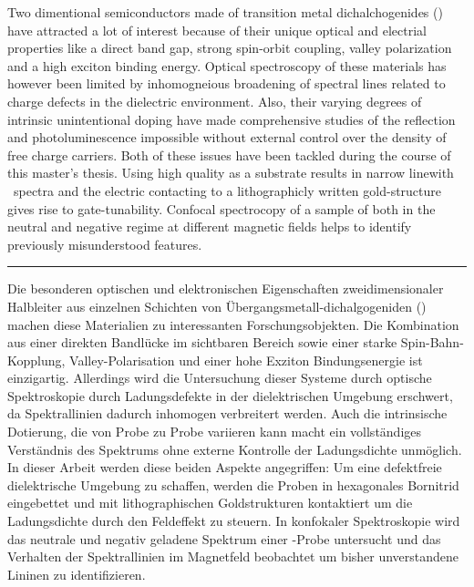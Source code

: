 
Two dimentional semiconductors made of transition metal dichalchogenides (\tmds\!) have attracted a lot of interest because of their unique optical and electrial properties like a direct band gap, strong spin-orbit coupling, valley polarization and a high exciton binding energy. Optical spectroscopy of these materials has however been limited by inhomogneious broadening of spectral lines related to charge defects in the dielectric environment. Also, their varying degrees of intrinsic unintentional doping have made comprehensive studies of the reflection and photoluminescence impossible without external control over the density of free charge carriers. Both of these issues have been tackled during the course of this master's thesis. Using high quality \hbng as a substrate results in narrow linewith \pl\ spectra and the electric contacting to a lithographicly written gold-structure gives rise to gate-tunability. Confocal spectrocopy of a sample of \wse both in the neutral and negative regime at different magnetic fields helps to identify previously misunderstood features.\newline
\begin{center}
\par\rule[8pt]{0.7\textwidth}{1pt}
\end{center}
Die besonderen optischen und elektronischen Eigenschaften zweidimensionaler Halbleiter aus einzelnen Schichten von Übergangsmetall-dichalgogeniden (\tmds\!) machen diese Materialien zu interessanten Forschungsobjekten. Die Kombination aus einer direkten Bandlücke im sichtbaren Bereich sowie einer starke Spin-Bahn-Kopplung, Valley-Polarisation und einer hohe Exziton Bindungsenergie ist einzigartig. Allerdings wird die Untersuchung dieser Systeme durch optische Spektroskopie durch Ladungsdefekte in der dielektrischen Umgebung erschwert, da Spektrallinien dadurch inhomogen verbreitert werden. Auch die intrinsische Dotierung, die von Probe zu Probe variieren kann macht ein vollständiges Verständnis des Spektrums ohne externe Kontrolle der Ladungsdichte unmöglich. In dieser Arbeit werden diese beiden Aspekte angegriffen: Um eine defektfreie dielektrische Umgebung zu schaffen, werden die Proben in hexagonales Bornitrid eingebettet und mit lithographischen Goldstrukturen kontaktiert um die Ladungsdichte durch den Feldeffekt zu steuern. In konfokaler Spektroskopie wird das neutrale und negativ geladene Spektrum einer \wse\!-Probe untersucht und das Verhalten der Spektrallinien im Magnetfeld beobachtet um bisher unverstandene Lininen zu identifizieren.